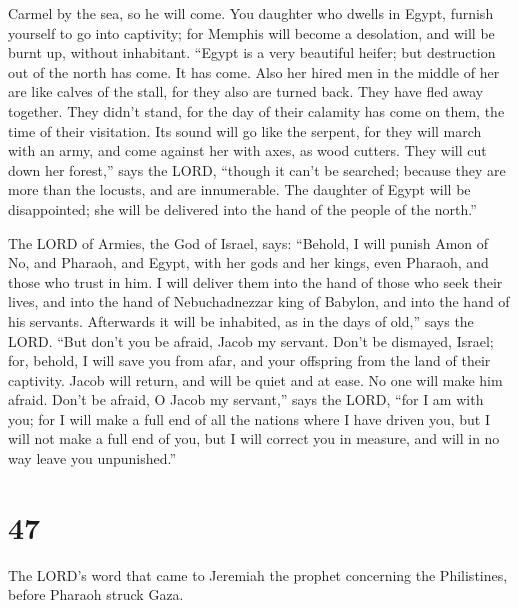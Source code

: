 Carmel by the sea, so he will come.  You daughter who
dwells in Egypt, furnish yourself to go into captivity; for Memphis will
become a desolation, and will be burnt up, without inhabitant.
 ``Egypt is a very beautiful heifer; but destruction out
of the north has come. It has come.  Also her hired men
in the middle of her are like calves of the stall, for they also are
turned back. They have fled away together. They didn't stand, for the
day of their calamity has come on them, the time of their visitation.
 Its sound will go like the serpent, for they will march
with an army, and come against her with axes, as wood cutters.
 They will cut down her forest,'' says the LORD, ``though
it can't be searched; because they are more than the locusts, and are
innumerable.  The daughter of Egypt will be disappointed;
she will be delivered into the hand of the people of the north.''

 The LORD of Armies, the God of Israel, says: ``Behold, I
will punish Amon of No, and Pharaoh, and Egypt, with her gods and her
kings, even Pharaoh, and those who trust in him.  I will
deliver them into the hand of those who seek their lives, and into the
hand of Nebuchadnezzar king of Babylon, and into the hand of his
servants. Afterwards it will be inhabited, as in the days of old,'' says
the LORD.  ``But don't you be afraid, Jacob my servant.
Don't be dismayed, Israel; for, behold, I will save you from afar, and
your offspring from the land of their captivity. Jacob will return, and
will be quiet and at ease. No one will make him afraid. 
Don't be afraid, O Jacob my servant,'' says the LORD, ``for I am with
you; for I will make a full end of all the nations where I have driven
you, but I will not make a full end of you, but I will correct you in
measure, and will in no way leave you unpunished.''

\hypertarget{section-46}{%
\section{47}\label{section-46}}

 The LORD's word that came to Jeremiah the prophet
concerning the Philistines, before Pharaoh struck Gaza.

